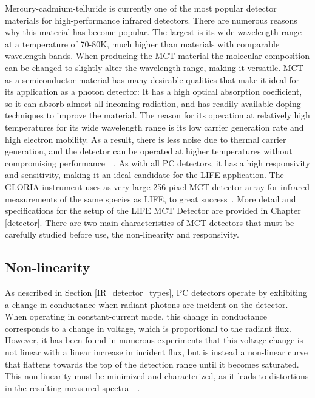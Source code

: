 Mercury-cadmium-telluride is currently one of the most popular detector materials for high-performance infrared detectors. There are numerous reasons why this material has become popular. The largest is its wide wavelength range at a temperature of 70-80K, much higher than materials with comparable wavelength bands. When producing the MCT material the molecular composition can be changed to slightly alter the wavelength range, making it versatile. MCT as a semiconductor material has many desirable qualities that make it ideal for its application as a photon detector: It has a high optical absorption coefficient, so it can absorb almost all incoming radiation, and has readily available doping techniques to improve the material. The reason for its operation at relatively high temperatures for its wide wavelength range is its low carrier generation rate and high electron mobility. As a result, there is less noise due to thermal carrier generation, and the detector can be operated at higher temperatures without compromising performance~\citep{mct_detector_text_new}~\citep{mct_detector_text_old}. As with all PC detectors, it has a high responsivity and sensitivity, making it an ideal candidate for the LIFE application. The GLORIA instrument uses as very large 256-pixel MCT detector array for infrared measurements of the same species as LIFE, to great success~\citep{GLORIA_concept}. More detail and specifications for the setup of the LIFE MCT Detector are provided in Chapter \ref{detector}. There are two main characteristics of MCT detectors that must be carefully studied before use, the non-linearity and responsivity.

\subsection{Non-linearity}\label{non-linerity}
As described in Section \ref{IR_detector_types}, PC detectors operate by exhibiting a change in conductance when radiant photons are incident on the detector. When operating in constant-current mode, this change in conductance corresponds to a change in voltage, which is proportional to the radiant flux. However, it has been found in numerous experiments that this voltage change is not linear with a linear increase in incident flux, but is instead a non-linear curve that flattens towards the top of the detection range until it becomes saturated. This non-linearity must be minimized and characterized, as it leads to distortions in the resulting measured spectra~\citep{MCT_linearity}~\citep{ele_inf_IR_signal_nonlinearity}.


